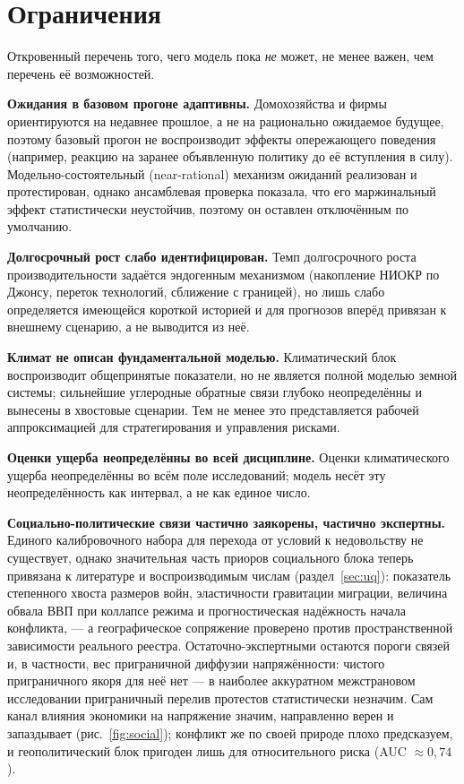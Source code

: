 \documentclass[11pt,a4paper]{article}
\begin{document}
\section{Ограничения}
\label{sec:limits}

Откровенный перечень того, чего модель пока \emph{не} может, не менее важен, чем перечень
её возможностей.

\textbf{Ожидания в базовом прогоне адаптивны.} Домохозяйства и фирмы ориентируются на
недавнее прошлое, а не на рационально ожидаемое будущее, поэтому базовый прогон не воспроизводит
эффекты опережающего поведения (например, реакцию на заранее объявленную политику до её
вступления в силу). Модельно-состоятельный (near-rational) механизм ожиданий реализован и
протестирован, однако ансамблевая проверка показала, что его маржинальный эффект статистически
неустойчив, поэтому он оставлен отключённым по умолчанию.

\textbf{Долгосрочный рост слабо идентифицирован.} Темп долгосрочного роста производительности
задаётся эндогенным механизмом (накопление НИОКР по Джонсу, переток технологий, сближение с
границей), но лишь слабо определяется имеющейся короткой историей и для прогнозов вперёд привязан
к внешнему сценарию, а не выводится из неё.

\textbf{Климат не описан фундаментальной моделью.} Климатический блок воспроизводит общепринятые
показатели, но не является полной моделью земной системы; сильнейшие углеродные обратные
связи глубоко неопределённы и вынесены в хвостовые сценарии. Тем не менее это представляется рабочей аппроксимацией для стратегирования и управления рисками.

\textbf{Оценки ущерба неопределённы во всей дисциплине.} Оценки климатического ущерба
неопределённы во всём поле исследований; модель несёт эту неопределённость как интервал, а
не как единое число.

\textbf{Социально-политические связи частично заякорены, частично экспертны.} Единого
калибровочного набора для перехода от условий к недовольству не существует, однако значительная
часть приоров социального блока теперь привязана к литературе и воспроизводимым числам
(раздел~\ref{sec:uq}): показатель степенного хвоста размеров войн, эластичности гравитации миграции,
величина обвала ВВП при коллапсе режима и прогностическая надёжность начала конфликта, --- а
географическое сопряжение проверено против пространственной зависимости реального реестра.
Остаточно-экспертными остаются пороги связей и, в частности, вес приграничной диффузии напряжённости:
чистого приграничного якоря для неё нет --- в наиболее аккуратном межстрановом исследовании
приграничный перелив протестов статистически незначим. Сам канал влияния экономики на напряжение
значим, направленно верен и запаздывает (рис.~\ref{fig:social}); конфликт же по своей природе плохо
предсказуем, и геополитический блок пригоден лишь для относительного риска (AUC ${\approx}0{,}74$).
\end{document}
